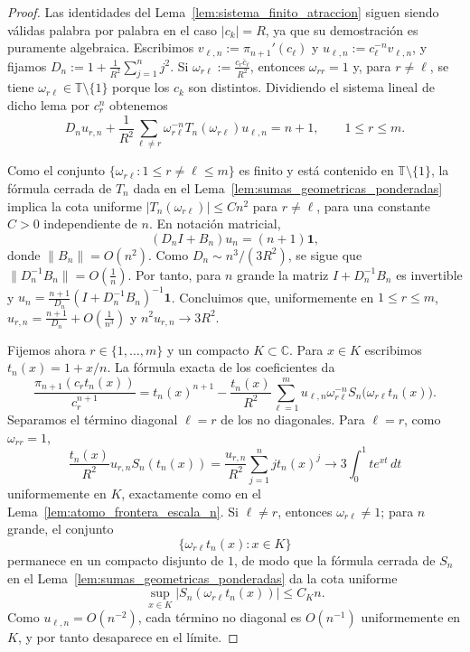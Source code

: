 \begin{proof}
	Las identidades del Lema~\ref{lem:sistema_finito_atraccion} siguen siendo válidas palabra por palabra en el caso $|c_k|=R$, ya que su demostración es puramente algebraica. Escribimos $v_{\ell,n}:=\pi_{n+1}'(c_\ell)$ y $u_{\ell,n}:=c_\ell^{-n}v_{\ell,n}$, y fijamos $D_n:=1+\frac1{R^2}\sum_{j=1}^n j^2$. Si $\omega_{r\ell}:=\frac{c_r\overline c_\ell}{R^2}$,
	entonces $\omega_{rr}=1$ y, para $r\neq \ell$, se tiene $\omega_{r\ell}\in\mathbb T\setminus\{1\}$ porque los $c_k$ son distintos. Dividiendo el sistema lineal de dicho lema por $c_r^n$ obtenemos
	\[
		D_n u_{r,n}
		+
		\frac1{R^2}\sum_{\ell\neq r}\omega_{r\ell}^{-n}T_n(\omega_{r\ell})u_{\ell,n}
		=
		n+1,
		\qquad 1\le r\le m.
	\]

	Como el conjunto $\{\omega_{r\ell}: 1\le r\neq \ell\le m\}$ es finito y está contenido en $\mathbb T\setminus\{1\}$, la fórmula cerrada de $T_n$ dada en el Lema~\ref{lem:sumas_geometricas_ponderadas} implica la cota uniforme $|T_n(\omega_{r\ell})|\le C n^2$ para $r\neq \ell$,
	para una constante $C>0$ independiente de $n$. En notación matricial,
	\[
		(D_n I+B_n)u_n=(n+1)\mathbf 1,
	\]
	donde $\|B_n\|=O(n^2)$. Como $D_n\sim n^3/(3R^2)$, se sigue que $\|D_n^{-1}B_n\|=O\!\left(\frac1n\right)$. Por tanto, para $n$ grande la matriz $I+D_n^{-1}B_n$ es invertible y $u_n=\frac{n+1}{D_n}(I+D_n^{-1}B_n)^{-1}\mathbf 1$. Concluimos que, uniformemente en $1\le r\le m$, $u_{r,n}=\frac{n+1}{D_n}+O\!\left(\frac1{n^3}\right)$ y $n^2u_{r,n}\longrightarrow 3R^2$.

	Fijemos ahora $r\in\{1,\dots,m\}$ y un compacto $K\subset\mathbb C$. Para $x\in K$ escribimos $t_n(x)=1+x/n$. La fórmula exacta de los coeficientes da
	\[
		\frac{\pi_{n+1}(c_r t_n(x))}{c_r^{n+1}}
		=
		t_n(x)^{n+1}
		-
		\frac{t_n(x)}{R^2}
		\sum_{\ell=1}^m u_{\ell,n}\omega_{r\ell}^{-n}S_n\!\bigl(\omega_{r\ell}t_n(x)\bigr).
	\]
	Separamos el término diagonal $\ell=r$ de los no diagonales. Para $\ell=r$, como $\omega_{rr}=1$,
	\[
		\frac{t_n(x)}{R^2}u_{r,n}S_n(t_n(x))
		=
		\frac{u_{r,n}}{R^2}\sum_{j=1}^n j t_n(x)^j
		\longrightarrow
		3\int_0^1 t e^{xt}\,dt
	\]
	uniformemente en $K$, exactamente como en el Lema~\ref{lem:atomo_frontera_escala_n}. Si $\ell\neq r$, entonces $\omega_{r\ell}\neq 1$; para $n$ grande, el conjunto
	\[
		\{\omega_{r\ell}t_n(x): x\in K\}
	\]
	permanece en un compacto disjunto de $1$, de modo que la fórmula cerrada de $S_n$ en el Lema~\ref{lem:sumas_geometricas_ponderadas} da la cota uniforme
	\[
		\sup_{x\in K}|S_n(\omega_{r\ell}t_n(x))|\le C_K n.
	\]
	Como $u_{\ell,n}=O(n^{-2})$, cada término no diagonal es $O(n^{-1})$ uniformemente en $K$, y por tanto desaparece en el límite.


\end{proof}

